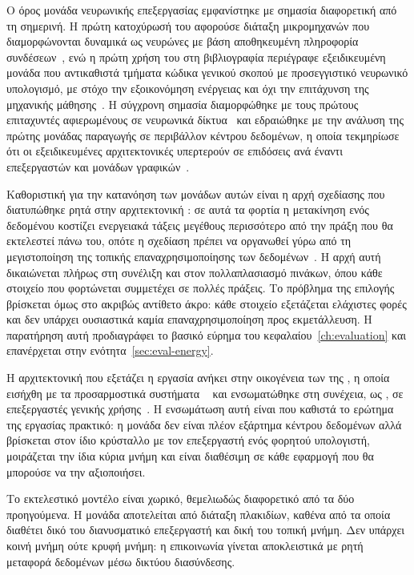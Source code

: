 Ο όρος μονάδα νευρωνικής επεξεργασίας εμφανίστηκε με σημασία διαφορετική από τη
σημερινή. Η πρώτη κατοχύρωσή του αφορούσε διάταξη μικρομηχανών που
διαμορφώνονται δυναμικά ως νευρώνες με βάση αποθηκευμένη πληροφορία
συνδέσεων~\cite{palmer2014npu}, ενώ η πρώτη χρήση του στη βιβλιογραφία περιέγραφε
εξειδικευμένη μονάδα που αντικαθιστά τμήματα κώδικα γενικού σκοπού με
προσεγγιστικό νευρωνικό υπολογισμό, με στόχο την εξοικονόμηση ενέργειας και όχι
την επιτάχυνση της μηχανικής μάθησης~\cite{esmaeilzadeh2012}. Η σύγχρονη σημασία διαμορφώθηκε με
τους πρώτους επιταχυντές αφιερωμένους σε νευρωνικά δίκτυα~\cite{chen2014diannao}
και εδραιώθηκε με την ανάλυση της πρώτης μονάδας παραγωγής σε περιβάλλον
κέντρου δεδομένων, η οποία τεκμηρίωσε ότι οι εξειδικευμένες αρχιτεκτονικές
υπερτερούν σε επιδόσεις ανά  έναντι επεξεργαστών και μονάδων
γραφικών~\cite{jouppi2017tpu}.

Καθοριστική για την κατανόηση των μονάδων αυτών είναι η αρχή σχεδίασης που
διατυπώθηκε ρητά στην αρχιτεκτονική : σε αυτά τα φορτία η μετακίνηση
ενός δεδομένου κοστίζει ενεργειακά τάξεις μεγέθους περισσότερο από την πράξη που
θα εκτελεστεί πάνω του, οπότε η σχεδίαση πρέπει να οργανωθεί γύρω από τη
μεγιστοποίηση της τοπικής επαναχρησιμοποίησης των δεδομένων~\cite{chen2016eyeriss}.
Η αρχή αυτή δικαιώνεται πλήρως στη συνέλιξη και στον πολλαπλασιασμό πινάκων, όπου
κάθε στοιχείο που φορτώνεται συμμετέχει σε πολλές πράξεις. Το πρόβλημα της
επιλογής  βρίσκεται όμως στο ακριβώς αντίθετο άκρο: κάθε στοιχείο
εξετάζεται ελάχιστες φορές και δεν υπάρχει ουσιαστικά καμία επαναχρησιμοποίηση
προς εκμετάλλευση. Η παρατήρηση αυτή προδιαγράφει το βασικό εύρημα του
κεφαλαίου~\ref{ch:evaluation} και επανέρχεται στην
ενότητα~\ref{sec:eval-energy}.

Η αρχιτεκτονική που εξετάζει η εργασία ανήκει στην οικογένεια των 
της , η οποία εισήχθη με τα προσαρμοστικά συστήματα
~\cite{amd2021versal} και ενσωματώθηκε στη συνέχεια, ως , σε
επεξεργαστές γενικής χρήσης~\cite{amd2024xdna}. Η ενσωμάτωση αυτή είναι που
καθιστά το ερώτημα της εργασίας πρακτικό: η μονάδα δεν είναι πλέον εξάρτημα
κέντρου δεδομένων αλλά βρίσκεται στον ίδιο κρύσταλλο με τον επεξεργαστή ενός
φορητού υπολογιστή, μοιράζεται την ίδια κύρια μνήμη και είναι διαθέσιμη σε κάθε
εφαρμογή που θα μπορούσε να την αξιοποιήσει.

Το εκτελεστικό μοντέλο είναι χωρικό, θεμελιωδώς διαφορετικό από τα δύο
προηγούμενα. Η μονάδα αποτελείται από διάταξη πλακιδίων, καθένα από τα οποία
διαθέτει δικό του διανυσματικό επεξεργαστή και δική του τοπική μνήμη. Δεν
υπάρχει κοινή μνήμη ούτε κρυφή μνήμη: η επικοινωνία γίνεται αποκλειστικά με ρητή
μεταφορά δεδομένων μέσω δικτύου διασύνδεσης.


